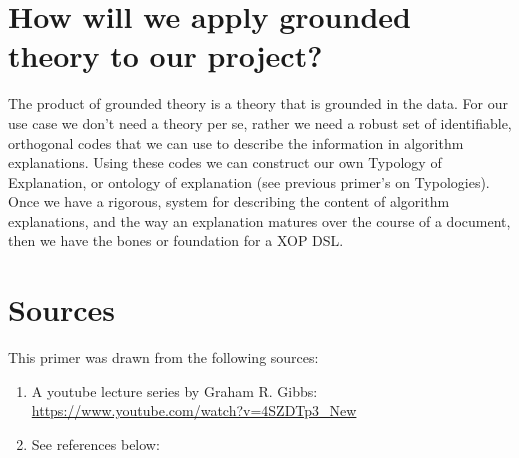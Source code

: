 \documentclass[10pt, letterpaper]{article}
\begin{document}
\section*{How will we apply grounded theory to our project?}
\label{sec:org6e55e88}
The product of grounded theory is a theory that is grounded in the data. For
our use case we don't need a theory per se, rather we need a robust set of
identifiable, orthogonal codes that we can use to describe the information in
algorithm explanations. Using these codes we can construct our own Typology of
Explanation, or ontology of explanation (see previous primer's on Typologies).
Once we have a rigorous, system for describing the content of algorithm
explanations, and the way an explanation matures over the course of a
document, then we have the bones or foundation for a XOP DSL.

\section*{Sources}
\label{sec:org94995e3}
This primer was drawn from the following sources:
\begin{enumerate}
\item A youtube lecture series by Graham R. Gibbs: \url{https://www.youtube.com/watch?v=4SZDTp3\_New}
\item See references below: \cite{charmaz2006constructing}
\end{enumerate}



\end{document}
